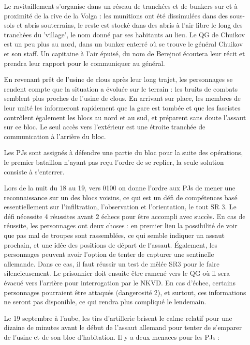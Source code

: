 \documentclass{report}
\begin{document}
\begin{multicols}{2}
Le ravitaillement s'organise dans un réseau de tranchées et de bunkers sur et à proximité de la rive de la Volga : les munitions ont été dissimulées dans des sous-sols et abris souterrains, le reste est stocké dans des abris à l'air libre le long des tranchées du 'village', le nom donné par ses habitants au lieu. Le QG de Chuikov est un peu plus au nord, dans un bunker enterré où se trouve le général Chuikov et son staff. Un capitaine à l'air épuisé, du nom de Berejnoï écoutera leur récit et prendra leur rapport pour le communiquer au général.

En revenant prêt de l'usine de clous après leur long trajet, les personnages se rendent compte que la situation a évoluée sur le terrain : les bruits de combats semblent plus proches de l'usine de clous. En arrivant sur place, les membres de leur unité les informeront rapidement que la gare est tombée et que les fascistes contrôlent également les blocs au nord et au sud, et préparent sans doute l'assaut sur ce bloc. Le seul accès vers l'extérieur est une étroite tranchée de communication à l'arrière du bloc.

Les PJs sont assignés à défendre une partie du bloc pour la suite des opérations, le premier bataillon n'ayant pas reçu l'ordre de se replier, la seule solution consiste à s'enterrer. 

Lors de la nuit du 18 au 19, vers 0100 on donne l'ordre aux PJs de mener une reconnaissance sur un des blocs voisins, ce qui est un défi de compétences basé essentiellement sur l'infiltration, l'observation et l'orientation, le tout SR 3. Le défi nécessite 4 réussites avant 2 échecs pour être accompli avec succès. En cas de réussite, les personnages ont deux choses : en premier lieu la possibilité de voir que pas mal de troupes sont rassemblées, ce qui semble indiquer un assaut prochain, et une idée des positions de départ de l'assaut. Également, les personnages peuvent avoir l'option de tenter de capturer une sentinelle allemande. Dans ce cas, il faut réussir un test de mêlée SR3 pour le faire silencieusement. Le prisonnier doit ensuite être ramené vers le QG où il sera évacué vers l'arrière pour interrogation par le NKVD. En cas d'échec, certains personnages pourraient être attaqués (dangerosité 2), et surtout, ces informations ne seront pas disponible, ce qui rendra plus compliqué le lendemain.

Le 19 septembre à l'aube, les tirs d'artillerie brisent le calme relatif pour une dizaine de minutes avant le début de l'assaut allemand pour tenter de s'emparer de l'usine et de son bloc d'habitation. Il y a deux menaces pour les PJs :


\end{multicols}
\end{document}
